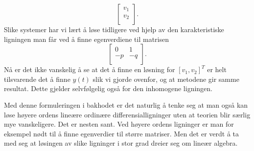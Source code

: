 \documentclass{article}
\theoremstyle{definition}
\theoremstyle{remark}
\begin{document}
\begin{multicols*}{2}
\begin{equation*}
  \begin{bmatrix}
    v_1 \\
    v_2 \\
  \end{bmatrix}.
\end{equation*}
Slike systemer har vi lært å løse tidligere ved hjelp av den karakteristiske ligningen man får ved å finne egenverdiene til matrisen
\begin{equation*}
  \begin{bmatrix}
    0 & 1 \\
    -p & -q \\
  \end{bmatrix}.
\end{equation*}
Nå er det ikke vanskelig å se at det å finne en løsning for $[v_1, v_2]^{T}$ er helt tilsvarende det å finne $y(t)$ slik vi gjorde ovenfor, og at metodene gir samme resultat. Dette gjelder selvfølgelig også for den inhomogene ligningen.

Med denne formuleringen i bakhodet er det naturlig å tenke seg at man også kan løse høyere ordens lineære ordinære differensialligninger uten at teorien blir særlig mye vanskeligere. Det er nesten sant. Ved høyere ordens ligninger er man for eksempel nødt til å finne egenverdier til større matriser. Men det er verdt å ta med seg at løsingen av slike ligninger i stor grad dreier seg om lineær algebra.

\end{multicols*}
\end{document}
